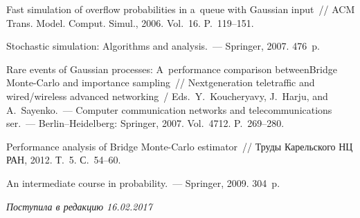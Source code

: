 \begin{multicols}{2}
{{\begin{thebibliography}{99}
 Fast simulation of overflow probabilities in 
a~queue with Gaussian input~// ACM Trans. Model. Comput. Simul., 2006. Vol.~16. 
P.~119--151.

 Stochastic simulation: Algorithms and analysis.~--- 
Springer, 2007. 476~p.

Rare events of Gaussian processes: A~performance comparison between\linebreak Bridge Monte-Carlo 
and importance sampling~// Next\linebreak generation teletraffic and wired/wireless advanced 
networking~/
Eds.\ Y.~Koucheryavy, J.~Harju, and A.~Sayen\-ko.~---
Computer communication networks and
telecommunications ser.~--- Berlin--Heidelberg: Springer, 2007. 
Vol.~4712. P.~269--280.

Performance analysis of Bridge Monte-Carlo estimator~// 
Труды Карельского НЦ РАН, 2012. Т.~5. С.~54--60.

 An intermediate course in probability.~--- Springer, 2009. 304~p.
\end{thebibliography}
} }

\end{multicols}

 \label{end\stat}

 \vspace*{-3pt}

\hfill{\small\textit{Поступила в редакцию  16.02.2017}}
\renewcommand{\figurename}{\protect\bf Рис.}
\renewcommand{\tablename}{\protect\bf Таблица}